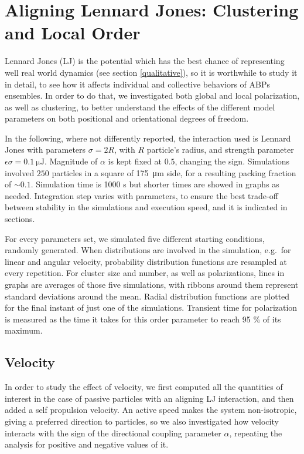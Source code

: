 \documentclass[../../master_thesis_np.tex]{subfiles}
\begin{document}
		\section{Aligning Lennard Jones: Clustering and Local Order}
		Lennard Jones (LJ) is the potential which has the best chance of representing well real world dynamics (see section \ref{qualitative}), so it is worthwhile to study it in detail, to see how it affects individual and collective behaviors of ABPs ensembles. 
		In order to do that, we investigated both global and local polarization, as well as clustering, to better understand the effects of the different model parameters on both positional and orientational degrees of freedom.
		
		In the following, where not differently reported, the interaction used is Lennard Jones with parameters $\sigma = 2R$, with $R$ particle's radius, and strength parameter $\epsilon \sigma = \SI{0.1}{\micro\joule}$.
		Magnitude of $\alpha$ is kept fixed at $0.5$, changing the sign.
		Simulations involved $250$ particles in a square of \SI{175}{\um} side, for a resulting packing fraction of $\sim 0.1$. 
		Simulation time is 1000 s but shorter times are showed in graphs as needed.
		Integration step varies with parameters, to ensure the best trade-off between stability in the simulations and execution speed, and it is indicated in sections.
		
		For every parameters set, we simulated five different starting conditions, randomly generated.
		When distributions are involved in the simulation, e.g.\ for linear and angular velocity, probability distribution functions are resampled at every repetition.
		For cluster size and number, as well as polarizations, lines in graphs are averages of those five simulations, with ribbons around them represent standard deviations around the mean.
		{\color{blue} Radial distribution functions are plotted for the final instant of just one of the simulations.}
		Transient time for polarization is measured as the time it takes for this order parameter to reach \num{95} \% of its maximum.
		
		\subsection{Velocity}
		In order to study the effect of velocity, we first computed all the quantities of interest in the case of passive particles with an aligning LJ interaction, and then added a self propulsion velocity. 
		An active speed makes the system non-isotropic, giving a preferred direction to particles, so we also investigated how velocity interacts with the sign of the directional coupling parameter $\alpha$, repeating the analysis for positive and negative values of it.
		
\end{document}
